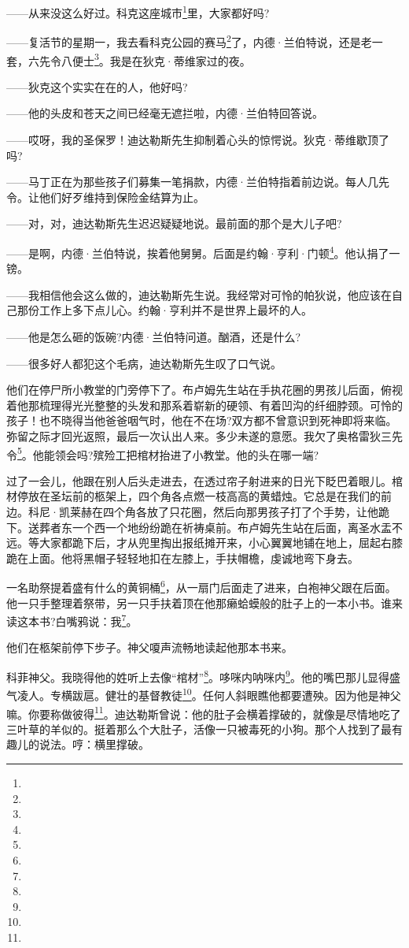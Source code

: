 \par ——从来没这么好过。科克这座城市\footnote{}里，大家都好吗?
\par ——复活节的星期一，我去看科克公园的赛马\footnote{}了，内德·兰伯特说，还是老一套，六先令八便士\footnote{}。我是在狄克·蒂维家过的夜。
\par ——狄克这个实实在在的人，他好吗?
\par ——他的头皮和苍天之间已经毫无遮拦啦，内德·兰伯特回答说。
\par ——哎呀，我的圣保罗！迪达勒斯先生抑制着心头的惊愕说。狄克·蒂维歇顶了吗?
\par ——马丁正在为那些孩子们募集一笔捐款，内德·兰伯特指着前边说。每人几先令。让他们好歹维持到保险金结算为止。
\par ——对，对，迪达勒斯先生迟迟疑疑地说。最前面的那个是大儿子吧?
\par ——是啊，内德·兰伯特说，挨着他舅舅。后面是约翰·亨利·门顿\footnote{}。他认捐了一镑。
\par ——我相信他会这么做的，迪达勒斯先生说。我经常对可怜的帕狄说，他应该在自己那份工作上多下点儿心。约翰·亨利并不是世界上最坏的人。
\par ——他是怎么砸的饭碗?内德·兰伯特问道。酗酒，还是什么?
\par ——很多好人都犯这个毛病，迪达勒斯先生叹了口气说。
\par 他们在停尸所小教堂的门旁停下了。布卢姆先生站在手执花圈的男孩儿后面，俯视着他那梳理得光光整整的头发和那系着崭新的硬领、有着凹沟的纤细脖颈。可怜的孩子！也不晓得当他爸爸咽气时，他在不在场?双方都不曾意识到死神即将来临。弥留之际才回光返照，最后一次认出人来。多少未遂的意愿。我欠了奥格雷狄三先令\footnote{}。他能领会吗?殡殓工把棺材抬进了小教堂。他的头在哪一端?
\par 过了一会儿，他跟在别人后头走进去，在透过帘子射进来的日光下眨巴着眼儿。棺材停放在圣坛前的柩架上，四个角各点燃一枝高高的黄蜡烛。它总是在我们的前边。科尼·凯莱赫在四个角各放了只花圈，然后向那男孩子打了个手势，让他跪下。送葬者东一个西一个地纷纷跪在祈祷桌前。布卢姆先生站在后面，离圣水盂不远。等大家都跪下后，才从兜里掏出报纸摊开来，小心翼翼地铺在地上，屈起右膝跪在上面。他将黑帽子轻轻地扣在左膝上，手扶帽檐，虔诚地弯下身去。
\par 一名助祭提着盛有什么的黄铜桶\footnote{}，从一扇门后面走了进来，白袍神父跟在后面。他一只手整理着祭带，另一只手扶着顶在他那癞蛤蟆般的肚子上的一本小书。谁来读这本书?白嘴鸦说：我\footnote{}。
\par 他们在柩架前停下步子。神父嗄声流畅地读起他那本书来。
\par 科菲神父。我晓得他的姓听上去像“棺材”\footnote{}。哆咪内呐咪内\footnote{}。他的嘴巴那儿显得盛气凌人。专横跋扈。健壮的基督教徒\footnote{}。任何人斜眼瞧他都要遭殃。因为他是神父嘛。你要称做彼得\footnote{}。迪达勒斯曾说：他的肚子会横着撑破的，就像是尽情地吃了三叶草的羊似的。挺着那么个大肚子，活像一只被毒死的小狗。那个人找到了最有趣儿的说法。哼：横里撑破。
